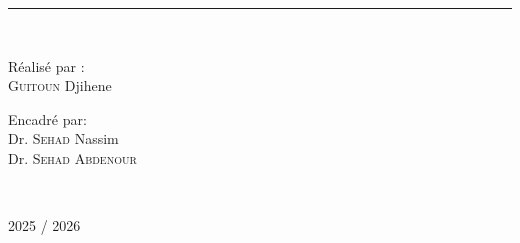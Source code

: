 \begin{titlepage}
{    }
    \rule{\linewidth}{0.3mm} \\[1cm]

    \vspace{10mm}

    \noindent
    \begin{minipage}{0.6\textwidth}
      \vspace{-7mm}
      \begin{flushleft} \large
        Réalisé par :\\
        \textsc{Guitoun} Djihene
      \end{flushleft}
    \end{minipage}
    \begin{minipage}{0.35\textwidth}
      \begin{flushright} \large
        \begin{flushleft} \large
          Encadré par: \\
          {
          Dr. \textsc{Sehad} Nassim\\[0.1cm]
          Dr. \textsc{Sehad Abdenour} 
          }
        \end{flushleft}
      \end{flushright}
    \end{minipage}\\[1cm]

    

    \vfill

    {\large 2025 / 2026}
\end{titlepage}
\restoregeometry